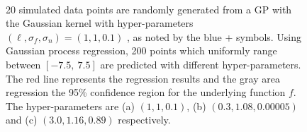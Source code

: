 \begin{figure}[!htbp]
	\centering
	\\
	\hspace{1cm}
	\caption[The effect of haperparameter on GP regression]
	{20 simulated data points are randomly generated from a GP with the Gaussian kernel with hyper-parameters $(\ell, \sigma_f,\sigma_n)=(1,1,0.1)$ , as noted by the blue + symbols. Using Gaussian process regression, 200 points which uniformly range between $[-7.5,~7.5]$ are predicted with different hyper-parameters. The red line represents the regression results and the gray area regression the 95\% confidence region for the underlying function $f$. The hyper-parameters are (a) $(1,1,0.1)$, (b) $(0.3,1.08,0.00005)$ and (c) $(3.0,1.16,0.89)$  respectively.}
	\label{fig:gpr_l}
\end{figure} 

